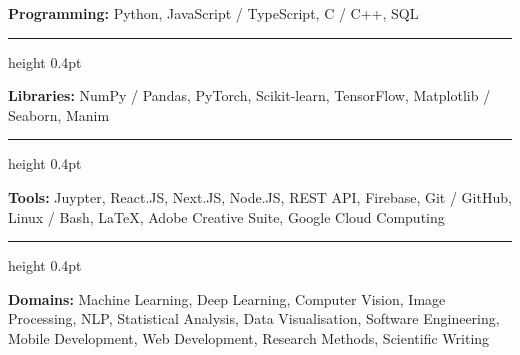 \documentclass[11pt,a4paper]{article}
\newcommand{\subline}{
    \vspace{4pt}
    \hrule height 0.4pt
    \vspace{6pt}
}
\begin{document}
\textbf{Programming:} Python, JavaScript / TypeScript, C / C++, SQL

\subline

\textbf{Libraries:} NumPy / Pandas, PyTorch, Scikit-learn, TensorFlow, Matplotlib / Seaborn, Manim

\subline

\textbf{Tools:} Juypter, React.JS, Next.JS, Node.JS, REST API, Firebase, Git / GitHub, Linux / Bash, LaTeX, Adobe Creative Suite, Google Cloud Computing

\subline

\textbf{Domains:} Machine Learning, Deep Learning, Computer Vision, Image Processing, NLP, Statistical Analysis, Data Visualisation, Software Engineering, Mobile Development, Web Development, Research Methods, Scientific Writing
\end{document}
